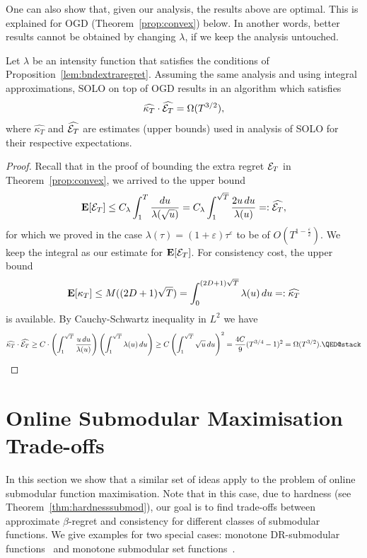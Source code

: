 One can also show that, given our analysis, the results above are optimal. This is explained for OGD (Theorem~\ref{prop:convex}) below. In another words, better results cannot be obtained by changing $\lambda$, if we keep the analysis untouched.
\begin{theorem}\label{thm:optimality} Let $\lambda$ be an intensity function that satisfies the conditions of Proposition~\ref{lem:bndextraregret}. Assuming the same analysis and using integral approximations, SOLO on top of OGD results in an  algorithm which satisfies
    \[
        \widehat{\kappa_T}\cdot \widehat{\mathcal{E}_T} = \Omega(T^{3/2}),
    \]
    where $\widehat{\kappa_T}$ and $\widehat{\mathcal{E}_T}$ are estimates (upper bounds) used in analysis of SOLO for their respective expectations.
\end{theorem}
\begin{proof}
    Recall that in the proof of bounding the extra regret $\mathcal{E}_T$ in Theorem~\ref{prop:convex}, we arrived to the upper bound
    \[
        \mathbf{E}[\mathcal{E}_T] \leq C_\lambda \int_1^T \frac{du}{\lambda(\sqrt{u})} = C_\lambda \int_1^{\sqrt{T}} \frac{2u\,du}{\lambda(u)} =: \widehat{\mathcal{E}_T},
    \]
    for which we proved in the case $\lambda(\tau) = (1+\varepsilon)\tau^\varepsilon$ to be of $O(T^{1- \frac{\varepsilon}{2}})$. We keep the integral as our estimate for $\mathbf{E}[\mathcal{E}_T]$. For consistency cost, the upper bound
    \[
        \mathbf{E}[\kappa_T] \leq  M((2D+1)\sqrt{T}) = \int_0^{(2D + 1)\sqrt{T}} \lambda(u)\,du =: \widehat{\kappa_T}
    \]
    is available. By Cauchy-Schwartz inequality in $L^2$ we have
    \[
        \widehat{\kappa_T}\cdot \widehat{\Ecal_T} \geq C\cdot\left( \int_1^{\sqrt{T}} \frac{u\, du}{\lambda(u)} \right) \left( \int_1^{\sqrt{T}} \lambda(u)\,du \right) \geq C \left(\int_1^{\sqrt{T}} \sqrt{u}\,du \right)^2 =\frac{4C}{9}(T^{3/4} - 1)^2 = \Omega(T^{3/2}).\qedhere
    \]
\end{proof}
\section{Online Submodular Maximisation Trade-offs}\label{sec:submodapplication}
In this section we show that a similar set of ideas apply to the problem of online submodular function maximisation. Note that in this case, due to hardness (see Theorem~\ref{thm:hardnesssubmod}), our goal is to find trade-offs between approximate $\beta$-regret and consistency for different classes of submodular functions. We give examples for two special cases: monotone DR-submodular functions~\cite{bian2016guaranteed} and monotone submodular set functions~\cite{nemhauser1978analysis}. 

